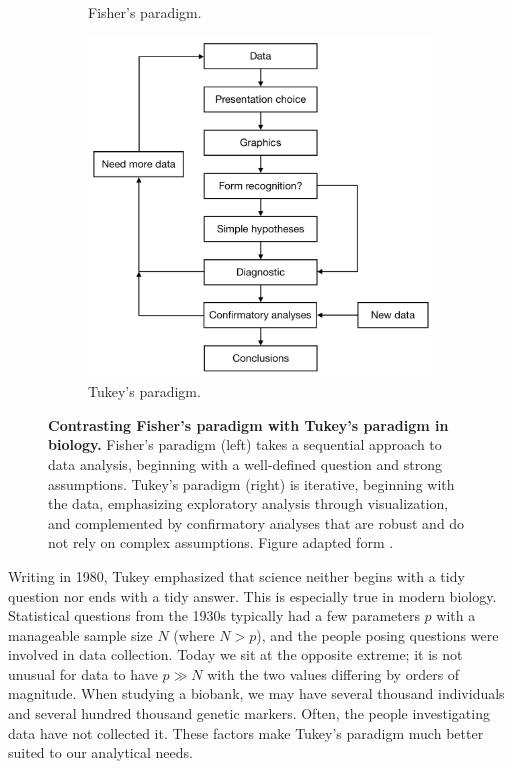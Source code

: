\begin{figure}[ht!]
\begin{subfigure}{0.3\textwidth}
    \caption{Fisher's paradigm.}
    \label{fig:fisher}
\end{subfigure}
\hfill
\begin{subfigure}{0.65\textwidth}
    \includegraphics[height=0.5\textheight]{main_figures/intro/tukey_paradigm.png}
    \caption{Tukey's paradigm.}
    \label{fig:tukey}
\end{subfigure}
\caption[Contrasting Fisher's paradigm with Tukey's paradigm in biology]{\textbf{Contrasting Fisher's paradigm with Tukey's paradigm in biology.} Fisher's paradigm (left) takes a sequential approach to data analysis, beginning with a well-defined question and strong assumptions. Tukey's paradigm (right) is iterative, beginning with the data, emphasizing exploratory analysis through visualization, and complemented by confirmatory analyses that are robust and do not rely on complex assumptions. Figure adapted form \citep{holmes_modern_2019}.}
\label{fig:paradigms}
\end{figure}

Writing in 1980, Tukey emphasized that science neither begins with a tidy question nor ends with a tidy answer\citep{tukey_we_1980}. This is especially true in modern biology. Statistical questions from the 1930s typically had a few parameters $p$ with a manageable sample size $N$ (where $N > p$), and the people posing questions were involved in data collection. Today we sit at the opposite extreme; it is not unusual for data to have $p \gg N$ with the two values differing by orders of magnitude. When studying a biobank, we may have several thousand individuals and several hundred thousand genetic markers. Often, the people investigating data have not collected it. These factors make Tukey's paradigm much better suited to our analytical needs\citep{holmes_modern_2019}. 

